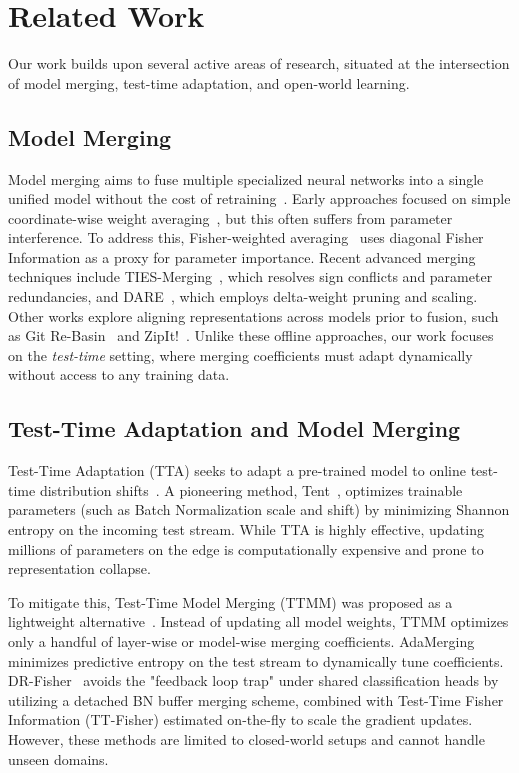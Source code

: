 \documentclass{article}
\theoremstyle{plain}
\theoremstyle{definition}
\theoremstyle{remark}
\begin{document}
\section{Related Work}
\label{submission_related}
Our work builds upon several active areas of research, situated at the intersection of model merging, test-time adaptation, and open-world learning.

\subsection{Model Merging}
Model merging aims to fuse multiple specialized neural networks into a single unified model without the cost of retraining~\cite{model_soups, task_arithmetic, fedavg}. Early approaches focused on simple coordinate-wise weight averaging~\cite{model_soups}, but this often suffers from parameter interference. To address this, Fisher-weighted averaging~\cite{fisher_merging} uses diagonal Fisher Information as a proxy for parameter importance. Recent advanced merging techniques include TIES-Merging~\cite{ties_merging}, which resolves sign conflicts and parameter redundancies, and DARE~\cite{dare_merging}, which employs delta-weight pruning and scaling. Other works explore aligning representations across models prior to fusion, such as Git Re-Basin~\cite{gitrebasin} and ZipIt!~\cite{zipit}. Unlike these offline approaches, our work focuses on the \textit{test-time} setting, where merging coefficients must adapt dynamically without access to any training data.

\subsection{Test-Time Adaptation and Model Merging}
Test-Time Adaptation (TTA) seeks to adapt a pre-trained model to online test-time distribution shifts~\cite{tent, cotta, memo}. A pioneering method, Tent~\cite{tent}, optimizes trainable parameters (such as Batch Normalization scale and shift) by minimizing Shannon entropy on the incoming test stream. While TTA is highly effective, updating millions of parameters on the edge is computationally expensive and prone to representation collapse. 

To mitigate this, Test-Time Model Merging (TTMM) was proposed as a lightweight alternative~\cite{adamerging, dr_fisher}. Instead of updating all model weights, TTMM optimizes only a handful of layer-wise or model-wise merging coefficients. AdaMerging~\cite{adamerging} minimizes predictive entropy on the test stream to dynamically tune coefficients. DR-Fisher~\cite{dr_fisher} avoids the "feedback loop trap" under shared classification heads by utilizing a detached BN buffer merging scheme, combined with Test-Time Fisher Information (TT-Fisher) estimated on-the-fly to scale the gradient updates. However, these methods are limited to closed-world setups and cannot handle unseen domains.
\end{document}
